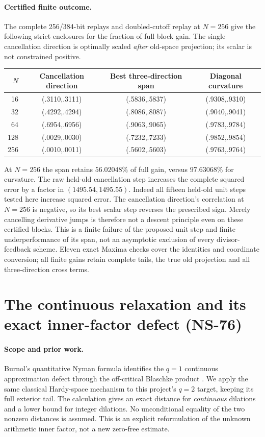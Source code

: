 \paragraph{Certified finite outcome.}
The complete 256/384-bit replays and doubled-cutoff replay at $N=256$
give the following strict enclosures for the fraction of full block gain.
The single cancellation direction is optimally scaled \emph{after} old-space
projection; its scalar is not constrained positive.
\begin{center}
\begin{tabular}{rccc}
\hline
$N$&Cancellation direction&Best three-direction span&Diagonal curvature\\
\hline
16&(.3110,.3111)&(.5836,.5837)&(.9308,.9310)\\
32&(.4292,.4294)&(.8086,.8087)&(.9040,.9041)\\
64&(.6954,.6956)&(.9063,.9065)&(.9783,.9784)\\
128&(.0029,.0030)&(.7232,.7233)&(.9852,.9854)\\
256&(.0010,.0011)&(.5602,.5603)&(.9763,.9764)\\
\hline
\end{tabular}
\end{center}
At $N=256$ the span retains $56.02048\%$ of full gain, versus
$97.63068\%$ for curvature. The raw held-old cancellation step increases
the complete squared error by a factor in $(1495.54,1495.55)$.
Indeed all fifteen held-old unit steps tested here increase squared error.
The cancellation direction's correlation at $N=256$ is negative, so its
best scalar step reverses the prescribed sign. Merely cancelling derivative
jumps is therefore not a descent principle even on these certified blocks.
This is a finite failure of the proposed unit step and finite underperformance
of its span, not an asymptotic exclusion of every divisor-feedback scheme.
Eleven exact Maxima checks cover the identities and coordinate conversion;
all finite gains retain complete tails, the true old projection and all
three-direction cross terms.

\section{The continuous relaxation and its exact inner-factor defect (NS-76)}
\label{sec:ns76-inner-distance}

\paragraph{Scope and prior work.}
Burnol's quantitative Nyman formula identifies the $q=1$ continuous
approximation defect through the off-critical Blaschke product
\cite[Theorem 1.2 and Lemma 2.4]{BurnolNyman2001}. We apply the same
classical Hardy-space mechanism to this project's $q=2$ target, keeping
its full exterior tail. The calculation gives an exact distance for
\emph{continuous} dilations and a lower bound for integer dilations.
No unconditional equality of the two nonzero distances is assumed.
This is an explicit reformulation of the unknown arithmetic inner
factor, not a new zero-free estimate.


